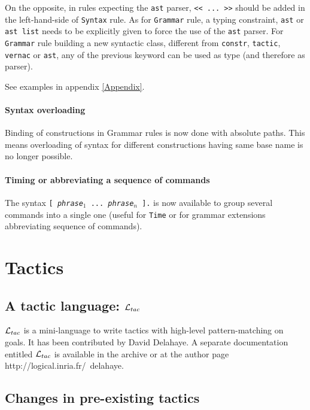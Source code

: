\documentclass[11pt]{article}
\begin{document}
On the opposite, in rules expecting the {\tt ast} parser,
{\verb:<< ... >>:} should be added in the left-hand-side of {\tt Syntax} rule.
As for {\tt Grammar} rule, a typing constraint, {\tt ast} or {\tt ast
list} needs to be explicitly given to force the use of the {\tt ast}
parser. For {\tt Grammar} rule building a new syntactic class,
different from {\tt constr}, {\tt tactic}, {\tt vernac} or {\tt ast},
any of the previous keyword can be used as type (and therefore as
parser).

See examples in appendix \ref{Appendix}.

\paragraph{Syntax overloading}

 Binding of constructions in Grammar rules is now done with absolute
  paths. This means overloading of syntax for different constructions
  having same base name is no longer possible.

\paragraph{Timing or abbreviating a sequence of commands}

The syntax {\tt [ {\it phrase$_1$} ... {\it phrase$_n$} ].} is now
available to group several commands into a single one (useful for
{\tt Time} or for grammar extensions abbreviating sequence of commands).

\section{Tactics}
\label{Tactics}
\def\ltac{{\cal L}_{tac}}

\subsection{A tactic language: $\ltac$}

$\ltac$ is a mini-language to write tactics with high-level
pattern-matching on goals. It has been contributed by David
Delahaye. A separate documentation entitled $\ltac$ is available in
the archive or at the author page http://logical.inria.fr/~delahaye.

\subsection{Changes in pre-existing tactics}
\label{TacticChanges}
\end{document}
